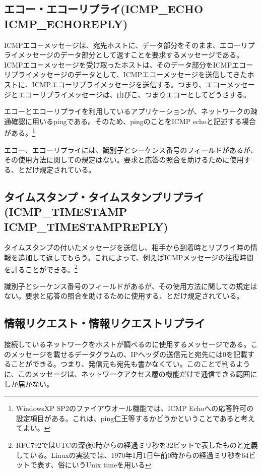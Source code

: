 \subsection{エコー・エコーリプライ(ICMP\_ECHO ICMP\_ECHOREPLY)}

ICMPエコーメッセージは、宛先ホストに、データ部分をそのまま、エコーリプライメッセージのデータ部分として返すことを要求するメッセージである。 ICMPエコーメッセージを受け取ったホストは、そのデータ部分をICMPエコーリプライメッセージのデータとして、ICMPエコーメッセージを送信してきたホストに、ICMPエコーリプライメッセージを送信する。つまり、エコーメッセージとエコーリプライメッセージは、山びこ、つまりエコーとしてどうさする。

エコーとエコーリプライを利用しているアプリケーションが、ネットワークの疎通確認に用いるpingである。そのため、pingのことをICMP echoと記述する場合がある。\footnote{WindowsXP SP2のファイアウオール機能では、ICMP Echoへの応答許可の設定項目がある。これは、ping仁王等するかどうかということであると考えてよい。}

エコー、エコーリプライには、識別子とシーケンス番号のフィールドがあるが、その使用方法に関しての規定はない。要求と応答の照合を助けるために使用する、とだけ規定されている。

\subsection{タイムスタンプ・タイムスタンプリプライ(ICMP\_TIMESTAMP ICMP\_TIMESTAMPREPLY)}

タイムスタンプの付いたメッセージを送信し、相手から到着時とリプライ時の情報を追加して返してもらう。これによって、例えばICMPメッセージの往復時間を計ることができる。\footnote{RFC792ではUTCの深夜0時からの経過ミリ秒を32ビットで表したものと定義している。Linuxの実装では、1970年1月1日午前0時からの経過ミリ秒を64ビットで表す、俗にいうUnix timeを用いる}

識別子とシーケンス番号のフィールドがあるが、その使用方法に関しての規定はない。要求と応答の照合を助けるために使用する、とだけ規定されている。
\subsection{情報リクエスト・情報リクエストリプライ}

接続しているネットワークをホストが調べるのに使用するメッセージである。このメッセージを載せるデータグラムの、IPヘッダの送信元と宛先には0を記載することができる。つまり、発信元も宛先も書かなくてい。このことで判るように、このメッセージは、ネットワークアクセス層の機能だけで通信できる範囲にしか届かない。


